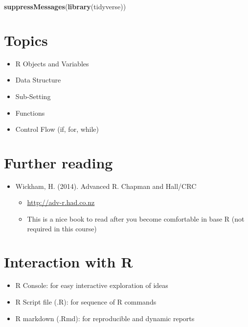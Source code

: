 \documentclass[]{book}
\newenvironment{Shaded}{\begin{snugshade}}{\end{snugshade}}
\newcommand{\KeywordTok}[1]{\textcolor[rgb]{0.13,0.29,0.53}{\textbf{{#1}}}}
\newcommand{\NormalTok}[1]{{#1}}
\providecommand{\tightlist}{%
  \setlength{\itemsep}{0pt}\setlength{\parskip}{0pt}}
\begin{document}
\begin{Shaded}
\begin{Highlighting}[]
\KeywordTok{suppressMessages}\NormalTok{(}\KeywordTok{library}\NormalTok{(tidyverse))}
\end{Highlighting}
\end{Shaded}

\section{Topics}\label{topics}

\begin{itemize}
\tightlist
\item
  R Objects and Variables
\item
  Data Structure
\item
  Sub-Setting
\item
  Functions
\item
  Control Flow (if, for, while)
\end{itemize}

\section{Further reading}\label{further-reading}

\begin{itemize}
\tightlist
\item
  Wickham, H. (2014). Advanced R. Chapman and Hall/CRC

  \begin{itemize}
  \tightlist
  \item
    \url{http://adv-r.had.co.nz}
  \item
    This is a nice book to read after you become comfortable in base R
    (not required in this course)
  \end{itemize}
\end{itemize}

\section{Interaction with R}\label{interaction-with-r}

\begin{itemize}
\tightlist
\item
  R Console: for easy interactive exploration of ideas
\item
  R Script file (.R): for sequence of R commands
\item
  R markdown (.Rmd): for reproducible and dynamic reports
\end{itemize}
\end{document}
